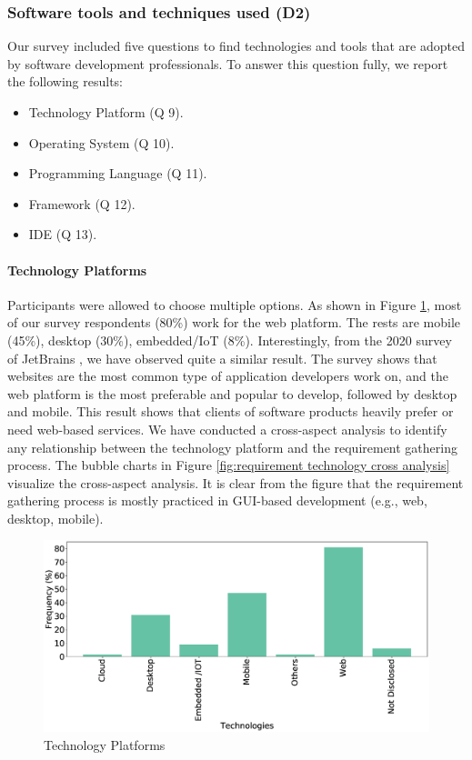 \subsubsection{Software tools and techniques used (D2)}
\label{tools}
Our survey included five questions to find technologies and tools that are adopted by software development professionals. To answer this question fully, we report the following results:

\begin{itemize}
\item Technology Platform (Q 9).
\item Operating System (Q 10).
\item Programming Language (Q 11).
\item Framework (Q 12).
\item IDE (Q 13).
\end{itemize}


\paragraph{Technology Platforms}
Participants were allowed to choose multiple options. As shown in Figure \ref{fig:platforms}, most of our survey respondents (80\%) work for the web platform. The rests are mobile (45\%), desktop (30\%), embedded/IoT (8\%). Interestingly, from the 2020 survey of JetBrains \cite{JetBrains2020}, we have observed quite a similar result. The survey shows that websites are the most common type of application developers work on, and the web platform is the most preferable and popular to develop, followed by desktop and mobile. This result shows that clients of software products heavily prefer or need web-based services. We have conducted a cross-aspect analysis to identify any relationship between the technology platform and the requirement gathering process. The bubble charts in Figure \ref{fig:requirement technology cross analysis} visualize the cross-aspect analysis. It is clear from the figure that the requirement gathering process is mostly practiced in GUI-based development (e.g., web, desktop, mobile).
\begin{figure}[h]
\centering
  \includegraphics[scale=0.18]{Figures/Respondents_Technologies}
  \caption{Technology Platforms}
  \label{fig:platforms}
\end{figure}

